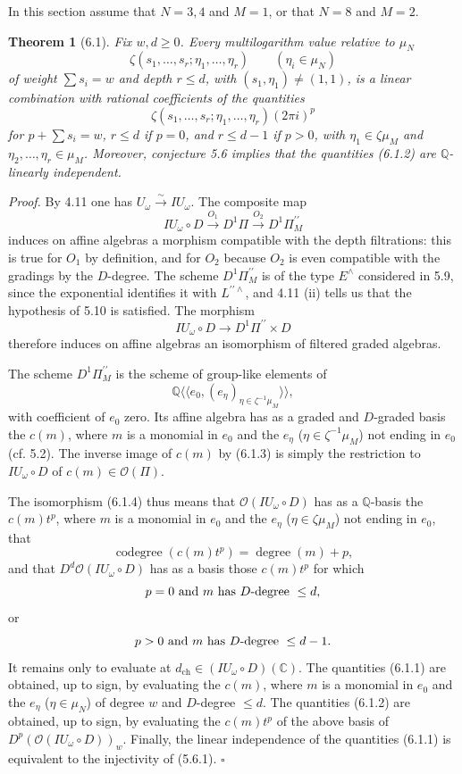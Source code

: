 \documentclass[10pt,a4paper]{article}
\newcommand{\Q}{\mathbb Q}
\newcommand{\OO}{\mathcal O}
\newcommand{\C}{\mathbb C}
\theoremstyle{deligne}
\newtheorem*{theorem*}{Theorem}
\newenvironment{proofdel}{\textit{Proof.}}{\hfill$\square$}
\begin{document}
In this section assume that \(N=3,4\) and \(M=1\), or that \(N=8\) and \(M=2\).

\begin{theorem*}[6.1]
Fix \(w,d\ge0\). Every multilogarithm value relative to \(\mu_N\)
\[
\tag{6.1.1}
\zeta(s_1,\ldots,s_r;\eta_1,\ldots,\eta_r)\qquad(\eta_i\in\mu_N)
\]
of weight \(\sum s_i=w\) and depth \(r\le d\), with \((s_1,\eta_1)\ne(1,1)\), is a linear combination with rational coefficients of the quantities
\[
\tag{6.1.2}
\zeta(s_1,\ldots,s_r;\eta_1,\ldots,\eta_r)(2\pi i)^p
\]
for \(p+\sum s_i=w\), \(r\le d\) if \(p=0\), and \(r\le d-1\) if \(p>0\), with \(\eta_1\in\zeta\mu_M\) and \(\eta_2,\ldots,\eta_r\in\mu_M\). Moreover, conjecture 5.6 implies that the quantities (6.1.2) are \(\Q\)-linearly independent.
\end{theorem*}

\begin{proofdel}
By 4.11 one has \(U_\omega\overset{\sim}{\longrightarrow}IU_\omega\). The composite map
\[
\tag{6.1.3}
IU_\omega\circ D\xrightarrow{O_1}D^1\Pi\xrightarrow{O_2}D^1\Pi_M^{\prime\prime}
\]
induces on affine algebras a morphism compatible with the depth filtrations: this is true for \(O_1\) by definition, and for \(O_2\) because \(O_2\) is even compatible with the gradings by the \(D\)-degree. The scheme \(D^1\Pi_M^{\prime\prime}\) is of the type \(E^\wedge\) considered in 5.9, since the exponential identifies it with \(L^{\prime\prime\wedge}\), and 4.11 (ii) tells us that the hypothesis of 5.10 is satisfied. The morphism
\[
\tag{6.1.4}
IU_\omega\circ D\longrightarrow D^1\Pi^{\prime\prime}\times D
\]
therefore induces on affine algebras an isomorphism of filtered graded algebras.

The scheme \(D^1\Pi_M^{\prime\prime}\) is the scheme of group-like elements of
\[
\Q\langle\!\langle e_0,(e_\eta)_{\eta\in\zeta^{-1}\mu_M}\rangle\!\rangle,
\]
with coefficient of \(e_0\) zero. Its affine algebra has as a graded and \(D\)-graded basis the \(c(m)\), where \(m\) is a monomial in \(e_0\) and the \(e_\eta\) (\(\eta\in\zeta^{-1}\mu_M\)) not ending in \(e_0\) (cf. 5.2). The inverse image of \(c(m)\) by (6.1.3) is simply the restriction to \(IU_\omega\circ D\) of \(c(m)\in\OO(\Pi)\).

The isomorphism (6.1.4) thus means that \(\OO(IU_\omega\circ D)\) has as a \(\Q\)-basis the \(c(m)t^p\), where \(m\) is a monomial in \(e_0\) and the \(e_\eta\) (\(\eta\in\zeta\mu_M\)) not ending in \(e_0\), that
\[
\operatorname{codegree}(c(m)t^p)=\operatorname{degree}(m)+p,
\]
and that \(D^d\OO(IU_\omega\circ D)\) has as a basis those \(c(m)t^p\) for which
\[
p=0\hbox{ and }m\hbox{ has }D\hbox{-degree }\le d,
\]
or
\[
p>0\hbox{ and }m\hbox{ has }D\hbox{-degree }\le d-1.
\]
It remains only to evaluate at \(d_{\mathrm{ch}}\in(IU_\omega\circ D)(\C)\). The quantities (6.1.1) are obtained, up to sign, by evaluating the \(c(m)\), where \(m\) is a monomial in \(e_0\) and the \(e_\eta\) (\(\eta\in\mu_N\)) of degree \(w\) and \(D\)-degree \(\le d\). The quantities (6.1.2) are obtained, up to sign, by evaluating the \(c(m)t^p\) of the above basis of \(D^p(\OO(IU_\omega\circ D))_w\). Finally, the linear independence of the quantities (6.1.1) is equivalent to the injectivity of (5.6.1).
\end{proofdel}
\end{document}
